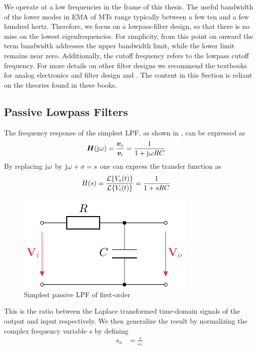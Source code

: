 We operate at a low frequencies in the frame of this thesis. The useful bandwidth of the lower modes in \ac{EMA} of \ac{MT}s range typically between a few ten and a few hundred hertz. Therefore, we focus on a lowpass-filter design, so that there is no miss on the lowest eigenfrequencies. For simplicity, from this point on onward the term bandwidth addresses the upper bandwidth limit, while the lower limit remains near zero. Additionally, the cutoff frequency refers to the lowpass cutoff frequency. For more details on other filter designs we recommend the textbooks for analog electronics and filter design \cite{Tietze2008EC, Stiny2019AeB} and \cite{williams2014analog}. The content in this Section is reliant on the theories found in these books.

\subsection{Passive Lowpass Filters}
The frequency response of the simplest \ac{LPF}, as shown in , can be expressed as
\begin{align}
  \bm{H}(\mathrm{j}\mkern1mu\omega) &= \frac{\bm{v}_o}{\bm{v}_i} = \frac{1}{1+\mathrm{j}\mkern1mu\omega RC}
\end{align}
By replacing $\mathrm{j}\mkern1mu\omega$ by $\mathrm{j}\mkern1mu\omega+\sigma = s$ one can express the transfer function as
\begin{align}
  H(s) &= \frac{\mathcal{L}\{V_o(t)\}}{\mathcal{L}\{V_i(t)\}} = \frac{1}{1 + sRC}
\end{align}

\begin{figure}[htb!]
  \centering
  \includegraphics[scale=1]{figures/electronics/lowpass/lp_passive_1ord/lp_passive_1ord}
  \caption[Passive first-order \ac{LPF}]{Simplest passive \ac{LPF} of first-order%
    \label{fig:lp_passive_1ord}}
\end{figure}

This is the ratio between the Laplace transformed time-domain signals of the output and input respectively. We then generalize the result by normalizing the complex frequency variable $s$ by defining
\begin{align}
  s_n &= \frac{s}{\omega_c}
\end{align}


